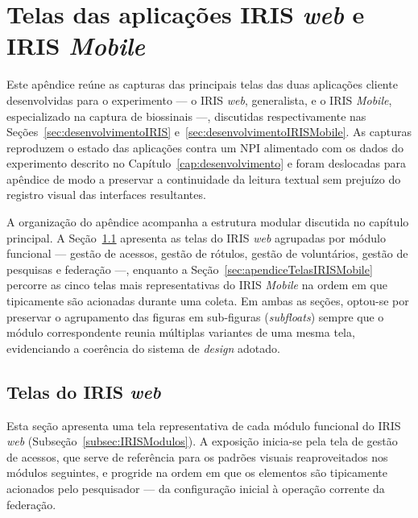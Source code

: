 
\chapter{Telas das aplicações IRIS \emph{web} e IRIS \textit{Mobile}}\label{cap:apendiceTelas}

Este apêndice reúne as capturas das principais telas das duas aplicações cliente desenvolvidas para o experimento --- o IRIS \emph{web}, generalista, e o IRIS \textit{Mobile}, especializado na captura de biossinais ---, discutidas respectivamente nas Seções~\ref{sec:desenvolvimentoIRIS} e~\ref{sec:desenvolvimentoIRISMobile}. As capturas reproduzem o estado das aplicações contra um NPI alimentado com os dados do experimento descrito no Capítulo~\ref{cap:desenvolvimento} e foram deslocadas para apêndice de modo a preservar a continuidade da leitura textual sem prejuízo do registro visual das interfaces resultantes.

A organização do apêndice acompanha a estrutura modular discutida no capítulo principal. A Seção~\ref{sec:apendiceTelasIRIS} apresenta as telas do IRIS \emph{web} agrupadas por módulo funcional --- gestão de acessos, gestão de rótulos, gestão de voluntários, gestão de pesquisas e federação ---, enquanto a Seção~\ref{sec:apendiceTelasIRISMobile} percorre as cinco telas mais representativas do IRIS \textit{Mobile} na ordem em que tipicamente são acionadas durante uma coleta. Em ambas as seções, optou-se por preservar o agrupamento das figuras em sub-figuras (\textit{subfloats}) sempre que o módulo correspondente reuni\-a múltiplas variantes de uma mesma tela, evidenciando a coerência do sistema de \textit{design} adotado.

\section{Telas do IRIS \emph{web}}\label{sec:apendiceTelasIRIS}

Esta seção apresenta uma tela representativa de cada módulo funcional do IRIS \emph{web} (Subseção~\ref{subsec:IRISModulos}). A exposição inicia-se pela tela de gestão de acessos, que serve de referência para os padrões visuais reaproveitados nos módulos seguintes, e progride na ordem em que os elementos são tipicamente acionados pelo pesquisador --- da configuração inicial à operação corrente da federação.

